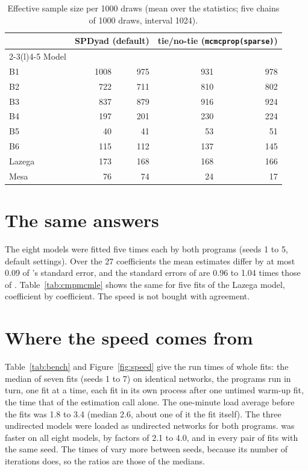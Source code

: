 \begin{table}[htbp]
\centering\small
\caption{Effective sample size per 1000 draws (mean over the statistics; five chains of 1000 draws, interval 1024).}\label{tab:spdmix}
\begin{tabular}{@{}lrrrr@{}}
\toprule
& \multicolumn{2}{c}{SPDyad (default)} & \multicolumn{2}{c}{tie/no-tie (\texttt{mcmcprop(sparse)})}\\
\cmidrule(lr){2-3}\cmidrule(l){4-5}
Model & \ergm{} & \nwergm{} & \ergm{} & \nwergm{}\\
\midrule
B1 & 1008 & 975 & 931 & 978\\
B2 & 722 & 711 & 810 & 802\\
B3 & 837 & 879 & 916 & 924\\
B4 & 197 & 201 & 230 & 224\\
B5 & 40 & 41 & 53 & 51\\
B6 & 115 & 112 & 137 & 145\\
Lazega & 173 & 168 & 168 & 166\\
Mesa & 76 & 74 & 24 & 17\\
\bottomrule
\end{tabular}
\end{table}

\section{The same answers}\label{sec:samest-answers}

The eight models were fitted five times each by both programs (seeds 1 to 5, default settings). Over the 27 coefficients the mean estimates differ by at most 0.09 of \ergm{}'s standard error, and the standard errors of \nwergm{} are 0.96 to 1.04 times those of \ergm{}. Table~\ref{tab:cmpmcmle} shows the same for five fits of the Lazega model, coefficient by coefficient. The speed is not bought with agreement.

\section{Where the speed comes from}\label{sec:samest-speed}

Table~\ref{tab:bench} and Figure~\ref{fig:speed} give the run times of whole fits: the median of seven fits (seeds 1 to 7) on identical networks, the programs run in turn, one fit at a time, each fit in its own process after one untimed warm-up fit, the time that of the estimation call alone. The one-minute load average before the fits was 1.8 to 3.4 (median 2.6, about one of it the fit itself). The three undirected models were loaded as undirected networks for both programs. \nwergm{} was faster on all eight models, by factors of 2.1 to 4.0, and in every pair of fits with the same seed. The times of \ergm{} vary more between seeds, because its number of iterations does, so the ratios are those of the medians.

